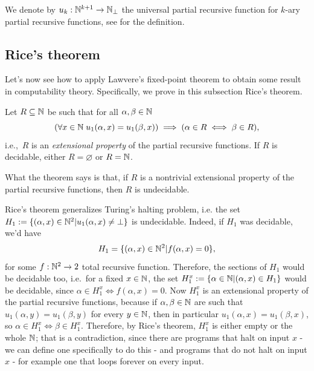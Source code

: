 \begin{notation}\label{idx:universal-function}
    We denote by $u_k : \mathbb{N}^{k+1} \to \mathbb{N}_\bot$ the universal partial recursive function for $k$-ary partial recursive functions, see \Cite[Definition~4.1, p.~13]{Streicher2002} for the definition.
\end{notation}

\subsection*{Rice's theorem}
Let's now see how to apply Lawvere's fixed-point theorem to obtain some result in computability theory. Specifically, we prove in this subsection Rice's theorem.

\begin{theorem}
    Let $R \subseteq \mathbb{N}$ be such that for all $\alpha,\beta \in\mathbb{N}$
    \[ \left(\forall x \in \mathbb{N} \; u_1(\alpha,x) = u_1(\beta,x)\right) \implies (\alpha \in R \iff \beta \in R),\]
    i.e.,\ $R$ is an \emph{extensional property} of the partial recursive functions. If $R$ is decidable, either $R = \varnothing$ or $R = \mathbb{N}$.
\end{theorem}

What the theorem says is that, if $R$ is a nontrivial extensional property of the partial recursive functions, then $R$ is undecidable.

\begin{remark}
    Rice's theorem generalizes Turing's halting problem, i.e. the set $H_1 := \{(\alpha,x) \in \mathbb{N}^2 | u_1(\alpha,x) \ne \bot\}$ is undecidable.
    Indeed, if $H_1$ was decidable, we'd have
    \[ H_1 = \{(\alpha,x) \in \mathbb{N}^2 | f(\alpha,x) = 0\}, \]
    for some $f : \mathbb{N}^2 \to 2$ total recursive function. Therefore, the sections of $H_1$ would be decidable too, i.e.\ for a fixed $x \in \mathbb{N}$, the set $H_1^x := \{\alpha \in \mathbb{N} | (\alpha,x) \in H_1\}$ would be decidable,
    since $\alpha \in H_1^x \iff f(\alpha,x) = 0$. Now $H_1^x$ is an extensional property of the partial recursive functions, because if $\alpha,\beta \in \mathbb{N}$ are such that $u_1(\alpha,y) = u_1(\beta,y)$ for every $y \in \mathbb{N}$,
    then in particular $u_1(\alpha,x) = u_1(\beta,x)$, so $\alpha \in H_1^x \iff \beta \in H_1^x$. Therefore, by Rice's theorem, $H_1^x$ is either empty or the whole $\mathbb{N}$; that is a contradiction, since there are programs that halt on input $x$ - we can define one specifically to do this - and programs that do not halt on input $x$ - for example one that loops forever on every input.
\end{remark}

